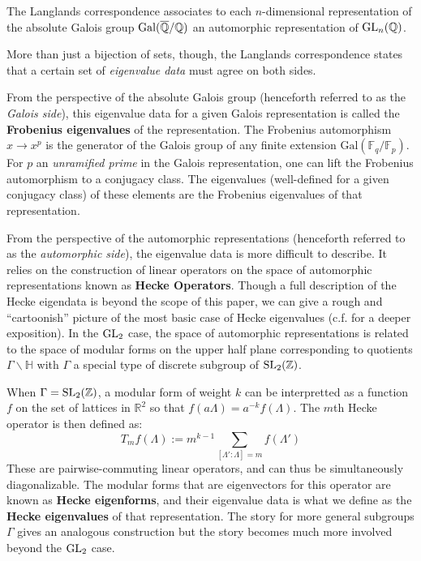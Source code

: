 \begin{idea}
	The Langlands correspondence associates to each $n$-dimensional representation of the absolute Galois group $\mathrm{Gal}(\overline {\mathbb{Q}}/\mathbb{Q})$ an automorphic representation of $\mathrm{GL}_n(\mathbb{Q})$.
\end{idea}
More than just a bijection of sets, though, the Langlands correspondence states that a certain set of \emph{eigenvalue data} must agree on both sides. 

From the perspective of the absolute Galois group (henceforth referred to as the \emph{Galois side}), this eigenvalue data for a given Galois representation is called the \textbf{Frobenius eigenvalues} of the representation. The Frobenius automorphism $x \to x^p$ is the generator of the Galois group of any finite extension $\mathrm{Gal}(\mathbb F_q/\mathbb F_p)$. For $p$ an \emph{unramified prime} in the Galois representation, one can lift the Frobenius automorphism to a conjugacy class. The eigenvalues (well-defined for a given conjugacy class) of these elements are the Frobenius eigenvalues of that representation. 

From the perspective of the automorphic representations (henceforth referred to as the \emph{automorphic side}), the eigenvalue data is more difficult to describe. It relies on the construction of linear operators on the space of automorphic representations known as \textbf{Hecke Operators}. Though a full description of the Hecke eigendata is beyond the scope of this paper, we can give a rough and ``cartoonish'' picture of the most basic case of Hecke eigenvalues (c.f. \cite{miyake1971, kudla2004} for a deeper exposition). In the $\mathrm{GL}_2$ case, the space of automorphic representations is related to the space of modular forms on the upper half plane corresponding to quotients $\Gamma \backslash \mathbb H$ with $\Gamma$ a special type of discrete subgroup of $\mathrm{SL}_2(\mathbb Z)$. 

When $\Gamma = \mathrm{SL}_2(\mathbb Z)$, a modular form of weight $k$ can be interpretted as a function $f$ on the set of lattices in $\mathbb R^2$ so that $f(a\Lambda) = a^{-k} f(\Lambda)$.
The $m$th Hecke operator is then defined as:
\[
	T_m f (\Lambda) := m^{k-1} \sum_{[\Lambda' : \Lambda] = m} f(\Lambda')
\]
These are pairwise-commuting linear operators, and can thus be simultaneously diagonalizable. 
The modular forms that are eigenvectors for this operator are known as \textbf{Hecke eigenforms}, and their eigenvalue data is what we define as the \textbf{Hecke eigenvalues} of that representation. The story for more general subgroups $\Gamma$ gives an analogous construction but the story becomes much more involved beyond the $\mathrm{GL}_2$ case.


